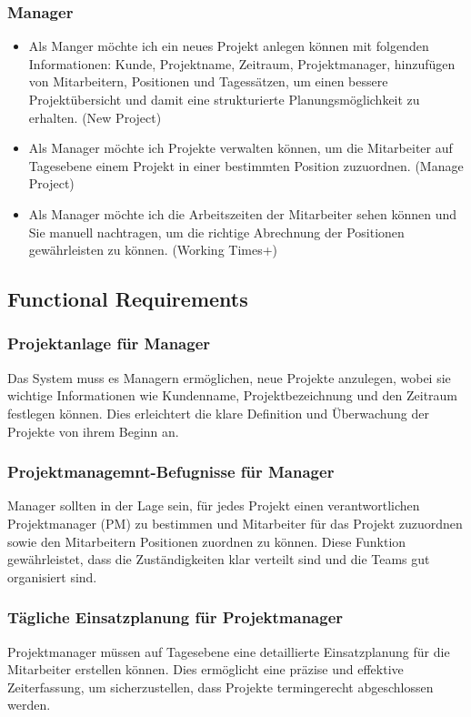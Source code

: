 \documentclass{article}
\begin{document}
        \subsubsection{ Manager}
        \begin{itemize}
        \item Als Manger möchte ich ein neues Projekt anlegen können mit folgenden Informationen: Kunde, Projektname, Zeitraum, Projektmanager, hinzufügen von Mitarbeitern, Positionen und Tagessätzen, um einen bessere Projektübersicht und damit eine strukturierte Planungsmöglichkeit zu erhalten. (New Project)
        \item Als Manager möchte ich Projekte verwalten können, um die Mitarbeiter auf Tagesebene einem Projekt in einer bestimmten Position zuzuordnen. (Manage Project)
        \item Als Manager möchte ich die Arbeitszeiten der Mitarbeiter sehen können und Sie manuell nachtragen, um die richtige Abrechnung der Positionen gewährleisten zu können. (Working Times+)
        \end{itemize}

    \subsection{ Functional Requirements}

        \subsubsection{Projektanlage für Manager}
        Das System muss es Managern ermöglichen, neue Projekte anzulegen, wobei sie wichtige Informationen wie Kundenname, Projektbezeichnung und den Zeitraum festlegen können. Dies erleichtert die klare Definition und Überwachung der Projekte von ihrem Beginn an.
        \subsubsection{Projektmanagemnt-Befugnisse für Manager}
        Manager sollten in der Lage sein, für jedes Projekt einen verantwortlichen Projektmanager (PM) zu bestimmen und Mitarbeiter für das Projekt zuzuordnen sowie den Mitarbeitern Positionen zuordnen zu können. Diese Funktion gewährleistet, dass die Zuständigkeiten klar verteilt sind und die Teams gut organisiert sind.
        \subsubsection{Tägliche Einsatzplanung für Projektmanager}
        Projektmanager müssen auf Tagesebene eine detaillierte Einsatzplanung für die Mitarbeiter erstellen können. Dies ermöglicht eine präzise und effektive Zeiterfassung, um sicherzustellen, dass Projekte termingerecht abgeschlossen werden.
\end{document}

